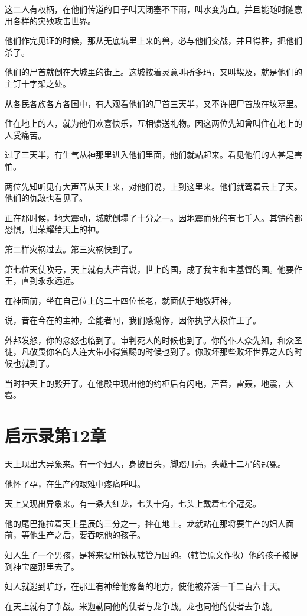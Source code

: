 \documentclass[12pt,oneside]{book}
\begin{document}
这二人有权柄，在他们传道的日子叫天闭塞不下雨，叫水变为血。并且能随时随意用各样的灾殃攻击世界。

他们作完见证的时候，那从无底坑里上来的兽，必与他们交战，并且得胜，把他们杀了。

他们的尸首就倒在大城里的街上。这城按着灵意叫所多玛，又叫埃及，就是他们的主钉十字架之处。

从各民各族各方各国中，有人观看他们的尸首三天半，又不许把尸首放在坟墓里。

住在地上的人，就为他们欢喜快乐，互相馈送礼物。因这两位先知曾叫住在地上的人受痛苦。

过了三天半，有生气从神那里进入他们里面，他们就站起来。看见他们的人甚是害怕。

两位先知听见有大声音从天上来，对他们说，上到这里来。他们就驾着云上了天。他们的仇敌也看见了。

正在那时候，地大震动，城就倒塌了十分之一。因地震而死的有七千人。其馀的都恐惧，归荣耀给天上的神。

第二样灾祸过去。第三灾祸快到了。

第七位天使吹号，天上就有大声音说，世上的国，成了我主和主基督的国。他要作王，直到永永远远。

在神面前，坐在自己位上的二十四位长老，就面伏于地敬拜神，

说，昔在今在的主神，全能者阿，我们感谢你，因你执掌大权作王了。

外邦发怒，你的忿怒也临到了。审判死人的时候也到了。你的仆人众先知，和众圣徒，凡敬畏你名的人连大带小得赏赐的时候也到了。你败坏那些败坏世界之人的时候也就到了。

当时神天上的殿开了。在他殿中现出他的约柜后有闪电，声音，雷轰，地震，大雹。

\chapter{启示录第12章}
天上现出大异象来。有一个妇人，身披日头，脚踏月亮，头戴十二星的冠冕。

他怀了孕，在生产的艰难中疼痛呼叫。

天上又现出异象来。有一条大红龙，七头十角，七头上戴着七个冠冕。

他的尾巴拖拉着天上星辰的三分之一，摔在地上。龙就站在那将要生产的妇人面前，等他生产之后，要吞吃他的孩子。

妇人生了一个男孩，是将来要用铁杖辖管万国的。（辖管原文作牧）他的孩子被提到神宝座那里去了。

妇人就逃到旷野，在那里有神给他豫备的地方，使他被养活一千二百六十天。

在天上就有了争战。米迦勒同他的使者与龙争战。龙也同他的使者去争战。
\end{document}
